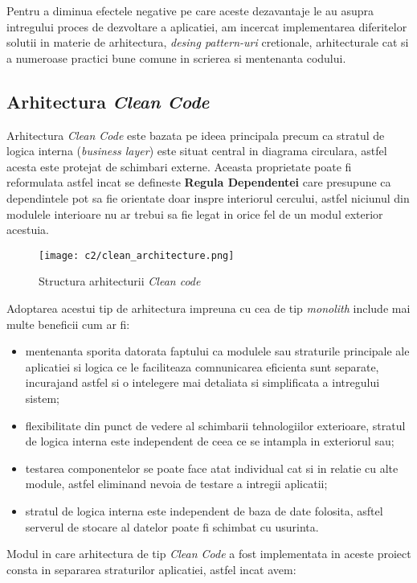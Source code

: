 Pentru a diminua efectele negative pe care aceste dezavantaje le au asupra intregului proces de dezvoltare a aplicatiei, am incercat implementarea diferitelor solutii in materie de arhitectura, \textit{desing pattern-uri} cretionale, arhitecturale cat si a numeroase practici bune comune in scrierea si mentenanta codului.

\subsection*{Arhitectura \textit{Clean Code}}
Arhitectura \textit{Clean Code } este bazata pe ideea principala precum ca stratul de logica interna (\textit{business layer}) este situat central in diagrama circulara, astfel acesta este protejat de schimbari externe. Aceasta proprietate poate fi reformulata astfel incat se defineste \textbf{Regula Dependentei} care presupune ca dependintele pot sa fie orientate doar inspre interiorul cercului, astfel niciunul din modulele interioare nu ar trebui sa fie legat in orice fel de un modul exterior acestuia.

\begin{figure}[h]
	\centering
	
	\texttt{[image: c2/clean\_architecture.png]}
	\caption{Structura arhitecturii \textit{Clean code}}
\end{figure}

Adoptarea acestui tip de arhitectura impreuna cu cea de tip \textit{monolith} include mai multe beneficii cum ar fi:

\begin{itemize}

	\item mentenanta sporita datorata faptului ca modulele sau straturile principale ale aplicatiei si logica ce le faciliteaza comnunicarea eficienta sunt separate, incurajand astfel si o intelegere mai detaliata si simplificata a intregului sistem;
	
	\item flexibilitate din punct de vedere al schimbarii tehnologiilor exterioare, stratul de logica interna este independent de ceea ce se intampla in exteriorul sau;
	
	\item testarea componentelor se poate face atat individual cat si in relatie cu alte module, astfel eliminand nevoia de testare a intregii aplicatii;
	
	\item stratul de logica interna este independent de baza de date folosita, asftel serverul de stocare al datelor poate fi schimbat cu usurinta.

\end{itemize} 
Modul in care arhitectura de tip \textit{Clean Code} a fost implementata in aceste proiect consta in separarea straturilor aplicatiei, astfel incat avem:

